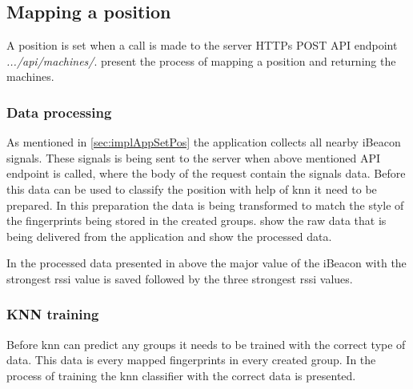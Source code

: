 \subsection{Mapping a position}\label{sec:implServerSetPos}
A position is set when a call is made to the server HTTPs POST API endpoint \textit{.../api/machines/}.
 present the process of mapping a position and returning the machines.


\subsubsection{Data processing}\label{sec:implServerSetPosDataProcessing}
As mentioned in \cref{sec:implAppSetPos} the application collects all nearby iBeacon signals.
These signals is being sent to the server when above mentioned API endpoint is called, where the body of the request contain the signals data.
Before this data can be used to classify the position with help of \acrfull{knn} it need to be prepared.
In this preparation the data is being transformed to match the style of the fingerprints being stored in the created groups.
 show the raw data that is being delivered from the application and  show the processed data.



In the processed data presented in  above the major value of the iBeacon with the strongest \acrshort{rssi} value is saved followed by the three strongest \acrshort{rssi} values.


\subsubsection{KNN training}\label{sec:implServerSetPosKnnTraining}

Before \acrshort{knn} can predict any groups it needs to be trained with the correct type of data.
This data is every mapped fingerprints in every created group.
In  the process of training the \acrshort{knn} classifier with the correct data is presented.

